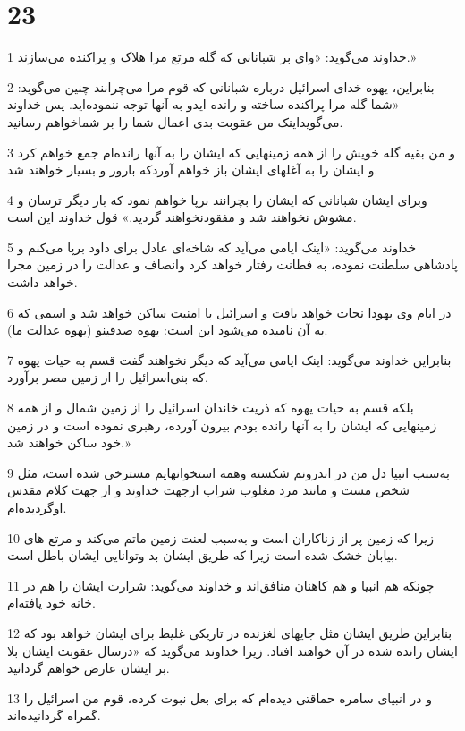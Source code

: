 \chapter{23}

\par 1 خداوند می‌گوید: «وای بر شبانانی که گله مرتع مرا هلاک و پراکنده می‌سازند.»
\par 2 بنابراین، یهوه خدای اسرائیل درباره شبانانی که قوم مرا می‌چرانند چنین می‌گوید: «شما گله مرا پراکنده ساخته و رانده ایدو به آنها توجه ننموده‌اید. پس خداوند می‌گویداینک من عقوبت بدی اعمال شما را بر شماخواهم رسانید.
\par 3 و من بقیه گله خویش را از همه زمینهایی که ایشان را به آنها رانده‌ام جمع خواهم کرد و ایشان را به آغلهای ایشان باز خواهم آوردکه بارور و بسیار خواهند شد.
\par 4 وبرای ایشان شبانانی که ایشان را بچرانند برپا خواهم نمود که بار دیگر ترسان و مشوش نخواهند شد و مفقودنخواهند گردید.» قول خداوند این است.
\par 5 خداوند می‌گوید: «اینک ایامی می‌آید که شاخه‌ای عادل برای داود برپا می‌کنم و پادشاهی سلطنت نموده، به فطانت رفتار خواهد کرد وانصاف و عدالت را در زمین مجرا خواهد داشت.
\par 6 در ایام وی یهودا نجات خواهد یافت و اسرائیل با امنیت ساکن خواهد شد و اسمی که به آن نامیده می‌شود این است: یهوه صدقینو (یهوه عدالت ما).
\par 7 بنابراین خداوند می‌گوید: اینک ایامی می‌آید که دیگر نخواهند گفت قسم به حیات یهوه که بنی‌اسرائیل را از زمین مصر برآورد.
\par 8 بلکه قسم به حیات یهوه که ذریت خاندان اسرائیل را از زمین شمال و از همه زمینهایی که ایشان را به آنها رانده بودم بیرون آورده، رهبری نموده است و در زمین خود ساکن خواهند شد.»
\par 9 به‌سبب انبیا دل من در اندرونم شکسته وهمه استخوانهایم مسترخی شده است، مثل شخص مست و مانند مرد مغلوب شراب ازجهت خداوند و از جهت کلام مقدس اوگردیده‌ام.
\par 10 زیرا که زمین پر از زناکاران است و به‌سبب لعنت زمین ماتم می‌کند و مرتع های بیابان خشک شده است زیرا که طریق ایشان بد وتوانایی ایشان باطل است.
\par 11 چونکه هم انبیا و هم کاهنان منافق‌اند و خداوند می‌گوید: شرارت ایشان را هم در خانه خود یافته‌ام.
\par 12 بنابراین طریق ایشان مثل جایهای لغزنده در تاریکی غلیظ برای ایشان خواهد بود که ایشان رانده شده در آن خواهند افتاد. زیرا خداوند می‌گوید که «درسال عقوبت ایشان بلا بر ایشان عارض خواهم گردانید.
\par 13 و در انبیای سامره حماقتی دیده‌ام که برای بعل نبوت کرده، قوم من اسرائیل را گمراه گردانیده‌اند.
